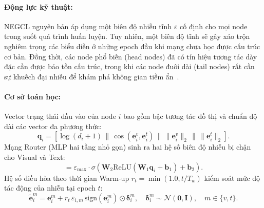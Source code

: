 \paragraph{Động lực kỹ thuật:}
NEGCL nguyên bản áp dụng một biên độ nhiễu tĩnh $\varepsilon$ cố định cho mọi node trong suốt quá trình huấn luyện. Tuy nhiên, một biên độ tĩnh sẽ gây xáo trộn nghiêm trọng các biểu diễn ở những epoch đầu khi mạng chưa học được cấu trúc cơ bản. Đồng thời, các node phổ biến (head nodes) đã có tín hiệu tương tác dày đặc cần được bảo tồn cấu trúc, trong khi các node đuôi dài (tail nodes) rất cần sự khuếch đại nhiễu để khám phá không gian tiềm ẩn~\cite{liu2025gated}.

\paragraph{Cơ sở toán học:}
Vector trạng thái đầu vào của node $i$ bao gồm bậc tương tác đồ thị và chuẩn độ dài các vector đa phương thức:
\begin{equation}
\mathbf{q}_i = \left[ \log(d_i + 1) \,\|\, \cos(\mathbf{e}_i^v, \mathbf{e}_i^t) \,\|\, \|\mathbf{e}_i^v\|_2 \,\|\, \|\mathbf{e}_i^t\|_2 \right].
\label{eq:n2_state_vector}
\end{equation}
Mạng Router (MLP hai tầng nhỏ gọn) sinh ra hai hệ số biên độ nhiễu bị chặn cho Visual và Text:
\begin{equation}
[\varepsilon_{i,v}, \varepsilon_{i,t}] = \varepsilon_{\text{max}} \cdot \sigma\left( \mathbf{W}_2 \text{ReLU}(\mathbf{W}_1 \mathbf{q}_i + \mathbf{b}_1) + \mathbf{b}_2 \right).
\label{eq:n2_mlp_router}
\end{equation}
Hệ số điều hòa theo thời gian Warm-up $r_t = \min(1.0, t / T_w)$ kiểm soát mức độ tác động của nhiễu tại epoch $t$:
\begin{equation}
\tilde{\mathbf{e}}_i^m = \mathbf{e}_i^m + r_t \, \varepsilon_{i,m} \, \text{sign}(\mathbf{e}_i^m) \odot \boldsymbol{\delta}_i^m, \quad \boldsymbol{\delta}_i^m \sim \mathcal{N}(\mathbf{0}, \mathbf{I}), \quad m \in \{v, t\}.
\label{eq:n2_noise_applied}
\end{equation}

